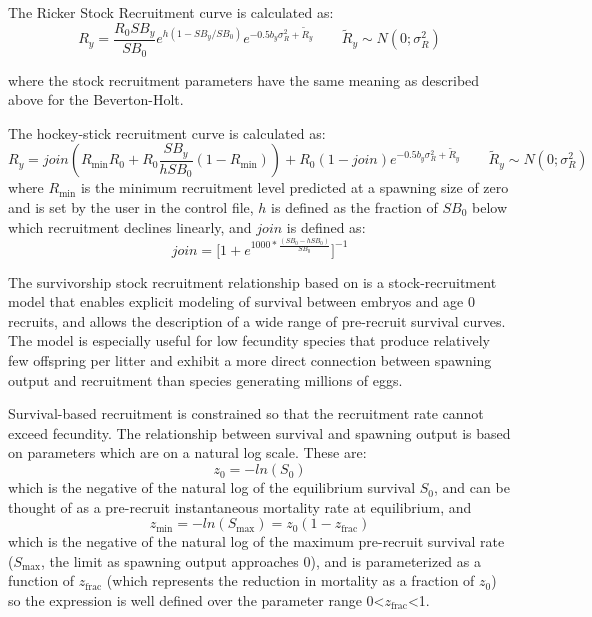 The Ricker Stock Recruitment curve is calculated as:
	\begin{equation}{R_y = \frac{R_0SB_y}{SB_0}e^{h(1-SB_y/SB_0)}e^{-0.5b_y\sigma^2_R+\tilde{R}_y}\qquad  \tilde{R}_y\sim N(0;\sigma^2_R)}
	\end{equation}
	
where the stock recruitment parameters have the same meaning as described above for the Beverton-Holt.
	
\hypertarget{Hockey}{}
The hockey-stick recruitment curve is calculated as:
	\begin{equation}{R_y = join(R_{\text{min}}R_0+R_0\frac{SB_y}{hSB_0}(1-R_{\text{min}}))+R_0(1-join)e^{-0.5b_y\sigma^2_R+\tilde{R}_y}\qquad  \tilde{R}_y\sim N(0;\sigma^2_R)}\end{equation}
where $R_{\text{min}}$ is the minimum recruitment level predicted at a spawning size of zero and is set by the user in the control file, $h$ is defined as the fraction of $SB_0$ below which recruitment declines linearly, and $join$ is defined as:
	\begin{equation}{ join = \bigg[1+e^{1000*\frac{(SB_0-hSB_0)}{SB_0}}\bigg]^{-1} } \end{equation}

\hypertarget{Survivorship}{}
The survivorship stock recruitment relationship based on \citet{taylor_stockrecruitment_2013} is a stock-recruitment model that enables explicit modeling of survival between embryos and age 0 recruits, and allows the description of a wide range of pre-recruit survival curves.  The model is especially useful for low fecundity species that produce relatively few offspring per litter and exhibit a more direct connection between spawning output and recruitment than species generating millions of eggs.
	
Survival-based recruitment is constrained so that the recruitment rate cannot exceed fecundity. The relationship between survival and spawning output is based on parameters which are on a natural log scale. These are:
	\begin{equation}
		z_0=-ln(S_0)
	\end{equation} 
which is the negative of the natural log of the equilibrium survival $S_0$, and can be thought of as a pre-recruit instantaneous mortality rate at equilibrium, and
	\begin{equation}
		z_{\text{min}}=-ln(S_{\text{max}})=z_0(1-z_{\text{frac}})
	\end{equation}
which is the negative of the natural log of the maximum pre-recruit survival rate ($S_{\text{max}}$, the limit as spawning output approaches 0), and is parameterized as a function of $z_{\text{frac}}$ (which represents the reduction in mortality as a fraction of $z_0$) so the expression is well defined over the parameter range 0<$z_{\text{frac}}$<1.
	

